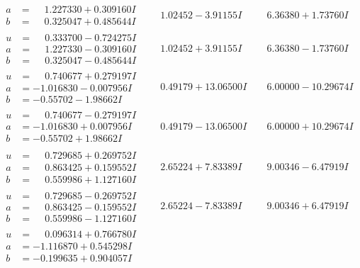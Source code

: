 \documentclass[1p]{elsarticle_modified}
\theoremstyle{definition}
\begin{document}
$$\begin{array}{c|c|c}
\begin{aligned}
a &= \phantom{-}1.227330 + 0.309160 I \\
b &= \phantom{-}0.325047 + 0.485644 I\end{aligned}
 & \phantom{-}1.02452 - 3.91155 I & \phantom{-}6.36380 + 1.73760 I \\ \hline\begin{aligned}
u &= \phantom{-}0.333700 - 0.724275 I \\
a &= \phantom{-}1.227330 - 0.309160 I \\
b &= \phantom{-}0.325047 - 0.485644 I\end{aligned}
 & \phantom{-}1.02452 + 3.91155 I & \phantom{-}6.36380 - 1.73760 I \\ \hline\begin{aligned}
u &= \phantom{-}0.740677 + 0.279197 I \\
a &= -1.016830 - 0.007956 I \\
b &= -0.55702 - 1.98662 I\end{aligned}
 & \phantom{-}0.49179 + 13.06500 I & \phantom{-}6.00000 - 10.29674 I \\ \hline\begin{aligned}
u &= \phantom{-}0.740677 - 0.279197 I \\
a &= -1.016830 + 0.007956 I \\
b &= -0.55702 + 1.98662 I\end{aligned}
 & \phantom{-}0.49179 - 13.06500 I & \phantom{-}6.00000 + 10.29674 I \\ \hline\begin{aligned}
u &= \phantom{-}0.729685 + 0.269752 I \\
a &= \phantom{-}0.863425 + 0.159552 I \\
b &= \phantom{-}0.559986 + 1.127160 I\end{aligned}
 & \phantom{-}2.65224 + 7.83389 I & \phantom{-}9.00346 - 6.47919 I \\ \hline\begin{aligned}
u &= \phantom{-}0.729685 - 0.269752 I \\
a &= \phantom{-}0.863425 - 0.159552 I \\
b &= \phantom{-}0.559986 - 1.127160 I\end{aligned}
 & \phantom{-}2.65224 - 7.83389 I & \phantom{-}9.00346 + 6.47919 I \\ \hline\begin{aligned}
u &= \phantom{-}0.096314 + 0.766780 I \\
a &= -1.116870 + 0.545298 I \\
b &= -0.199635 + 0.904057 I\end{aligned}

\end{array}$$
\end{document}
